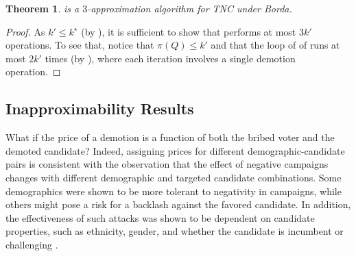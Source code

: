 \documentclass[letterpaper]{article} %
\newtheorem{theorem}{Theorem}
\newcommand{\SB}{\textsc{TNC}}
\newcommand{\CF}{\mathsf{BTNCRV}}
\begin{document}
\begin{theorem}
 is a $3$-approximation algorithm for \SB{} under Borda.
\end{theorem}
\begin{proof}
As $k' \leq k^\star$ (by ), it is sufficient to show that  performs at most $3k'$  operations. To see that, notice that $\pi(Q) \leq k'$ and that the loop of  of  runs   at most $2k'$ times (by ), where each iteration involves a single demotion operation.
\end{proof}

\subsection{Inapproximability Results \label{inaprox}}
What if the price of a demotion is a function of both the bribed voter and the demoted candidate? Indeed, assigning prices for different demographic-candidate pairs is consistent with the observation that the effect of negative campaigns changes with different  demographic and targeted candidate combinations. Some demographics were shown to be more tolerant to negativity in campaigns, while others might pose a risk for a backlash against the favored candidate. In addition, the effectiveness of such attacks was shown to be dependent on candidate properties, such as ethnicity, gender, and whether the candidate is  incumbent or challenging \cite{fridkin2011variability}.
\end{document}
